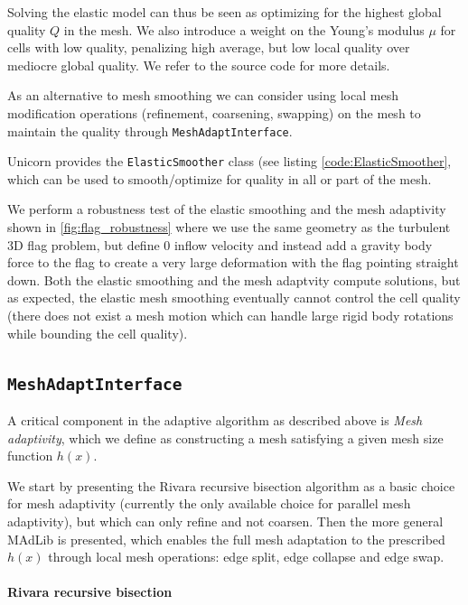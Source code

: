 Solving the elastic model can thus be seen as optimizing for the
highest global quality $Q$ in the mesh. We also introduce a weight on
the Young's modulus $\mu$ for cells with low quality, penalizing high
average, but low local quality over mediocre global quality. We refer
to the source code for more details.

As an alternative to mesh smoothing we can consider using local mesh
modification operations (refinement, coarsening, swapping) on the mesh
to maintain the quality \cite{Comp`ereRemacleJanssonEtAl2009}
through {\tt MeshAdaptInterface}.

Unicorn provides the {\tt ElasticSmoother} class (see
listing \ref{code:ElasticSmoother}, which can be used to
smooth/optimize for quality in all or part of the mesh.

We perform a robustness test of the elastic smoothing and the mesh
adaptivity shown in \ref{fig:flag_robustness} where we use the same
geometry as the turbulent 3D flag problem, but define 0 inflow
velocity and instead add a gravity body force to the flag to create a
very large deformation with the flag pointing straight down. Both the
elastic smoothing and the mesh adaptvity compute solutions, but as
expected, the elastic mesh smoothing eventually cannot control the
cell quality (there does not exist a mesh motion which can handle
large rigid body rotations while bounding the cell quality).

\subsection{\tt MeshAdaptInterface}

A critical component in the adaptive algorithm as described above is
{\em Mesh adaptivity}, which we define as constructing a mesh
satisfying a given mesh size function $h(x)$.

We start by presenting the Rivara recursive bisection
algorithm \cite{Rivara1992} as a basic choice for mesh adaptivity
(currently the only available choice for parallel mesh adaptivity),
but which can only refine and not coarsen. Then the more general
MAdLib is presented, which enables the full mesh adaptation to the
prescribed $h(x)$ through local mesh operations: edge split, edge
collapse and edge swap.

\paragraph{Rivara recursive bisection}

